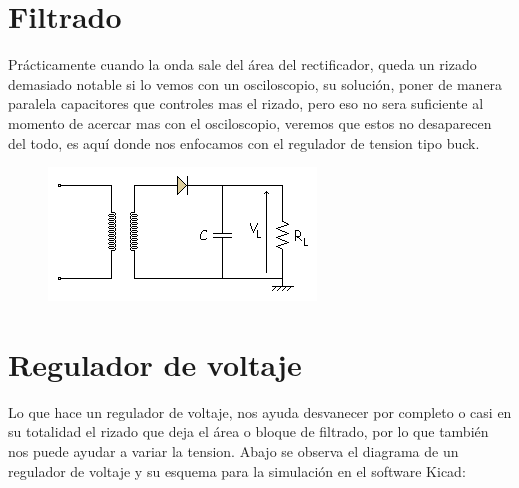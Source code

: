 \documentclass[11pt,a4paper]{article}
\begin{document}
\section{Filtrado}

Prácticamente cuando la onda sale del área del rectificador, queda un rizado demasiado notable si lo vemos con un osciloscopio, su solución, poner de manera paralela capacitores que controles mas el rizado, pero eso no sera suficiente al momento de acercar mas con el osciloscopio, veremos que estos no desaparecen del todo, es aquí donde nos enfocamos con el regulador de tension tipo buck.

\begin{figure}[h]
\begin{center}
\includegraphics[scale=0.5]{5.png}
\end{center}
\end{figure}

\section{Regulador de voltaje}

Lo que hace un regulador de voltaje, nos ayuda desvanecer por completo o casi en su totalidad el rizado que deja el área o bloque de filtrado, por lo que también nos puede ayudar a variar la tension. Abajo se observa el diagrama de un regulador de voltaje y su esquema para la simulación en el software Kicad:
\end{document}
